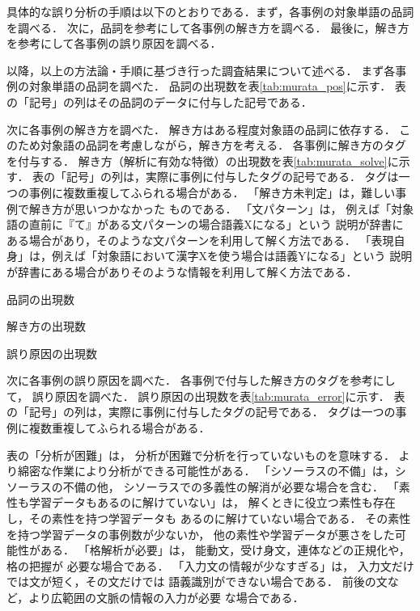 \documentclass[japanese]{jnlp_1.4}
\begin{document}
具体的な誤り分析の手順は以下のとおりである．まず，各事例の対象単語の品詞を調べる．
次に，品詞を参考にして各事例の解き方を調べる．
最後に，解き方を参考にして各事例の誤り原因を調べる．

以降，以上の方法論・手順に基づき行った調査結果について述べる．
まず各事例の対象単語の品詞を調べた．
品詞の出現数を表\ref{tab:murata_pos}に示す．
表の「記号」の列はその品詞のデータに付与した記号である．

次に各事例の解き方を調べた．
解き方はある程度対象語の品詞に依存する．
このため対象語の品詞を考慮しながら，解き方を考える．
各事例に解き方のタグを付与する．
解き方（解析に有効な特徴）の出現数を表\ref{tab:murata_solve}に示す．
表の「記号」の列は，実際に事例に付与したタグの記号である．
タグは一つの事例に複数重複してふられる場合がある．
「解き方未判定」は，難しい事例で解き方が思いつかなかった
ものである．
「文パターン」は，
例えば「対象語の直前に『て』がある文パターンの場合語義Xになる」という
説明が辞書にある場合があり，そのような文パターンを利用して解く方法である．
「表現自身」は，例えば「対象語において漢字Xを使う場合は語義Yになる」という
説明が辞書にある場合がありそのような情報を利用して解く方法である．

\begin{table}[b]
\vspace{-0.5\Cvs}
\caption{品詞の出現数}
\label{tab:murata_pos}

\end{table}
\begin{table}[b]
\caption{解き方の出現数}
\label{tab:murata_solve}

\end{table}
\begin{table}[b]
\caption{誤り原因の出現数}
\label{tab:murata_error}

\end{table}

次に各事例の誤り原因を調べた．
各事例で付与した解き方のタグを参考にして，
誤り原因を調べた．
誤り原因の出現数を表\ref{tab:murata_error}に示す．
表の「記号」の列は，実際に事例に付与したタグの記号である．
タグは一つの事例に複数重複してふられる場合がある．

表の「分析が困難」は，
分析が困難で分析を行っていないものを意味する．
より綿密な作業により分析ができる可能性がある．
「シソーラスの不備」は，シソーラスの不備の他，
シソーラスでの多義性の解消が必要な場合を含む．
「素性も学習データもあるのに解けていない」は，
解くときに役立つ素性も存在し，その素性を持つ学習データも
あるのに解けていない場合である．
その素性を持つ学習データの事例数が少ないか，
他の素性や学習データが悪さをした可能性がある．
「格解析が必要」は，
能動文，受け身文，連体などの正規化や，格の把握が
必要な場合である．
「入力文の情報が少なすぎる」は，
入力文だけでは文が短く，その文だけでは
語義識別ができない場合である．
前後の文など，より広範囲の文脈の情報の入力が必要
な場合である．
\end{document}

